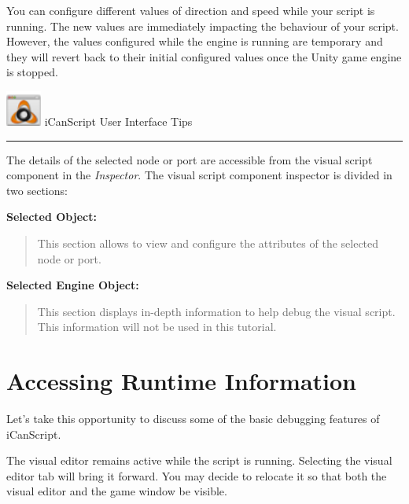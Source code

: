 You can configure different values of direction and speed while your script is running. The new values are immediately impacting the behaviour of your script. However, the values configured while the engine is running are temporary and they will revert back to their initial configured values once the Unity game engine is stopped.
\begin{tipbox}

\includegraphics[width=33pt,height=33pt]{icanscript-ui-tips_32x32x32.png} {\Large \color{black} iCanScript User Interface Tips }

\begin{center}\rule{\textwidth}{0.4pt}\end{center}

The details of the selected node or port are accessible from the visual script component in the \emph{Inspector}. The visual script component inspector is divided in two sections:

\textbf{Selected Object:}

\begin{quote}

This section allows to view and configure the attributes of the selected node or port.
\end{quote}

\textbf{Selected Engine Object:}

\begin{quote}

This section displays in-depth information to help debug the visual script. This information will not be used in this tutorial.
\end{quote}

\end{tipbox}



\section{Accessing Runtime Information}
\label{accessingruntimeinformation}

Let's take this opportunity to discuss some of the basic debugging features of iCanScript.

The visual editor remains active while the script is running. Selecting the visual editor tab will bring it forward. You may decide to relocate it so that both the visual editor and the game window be visible. 

